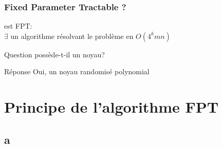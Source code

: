 \documentclass[9pt]{beamer}
\begin{document}
\begin{frame}
    \frametitle{Fixed Parameter Tractable ?}

    \begin{thrm}
        \oct est FPT: \\
        $\exists$ un algorithme résolvant le problème en $O(4^k mn)$
    \end{thrm}

    \pause
    \vfill

    \begin{exampleblock}{Question}
        \oct possède-t-il un noyau?
    \end{exampleblock}

    \pause
    \vfill

    \begin{alertblock}{Réponse}
        Oui, un noyau randomisé polynomial
    \end{alertblock}
\end{frame}

\section[Algorithme]{Principe de l'algorithme FPT}
\subsection*{a}
\end{document}
